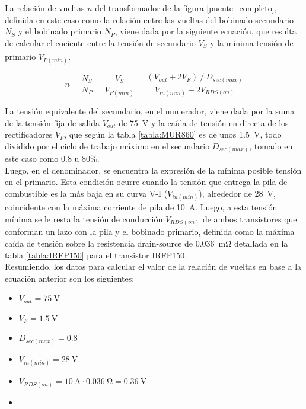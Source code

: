 La relación de vueltas $n$ del transformador de la figura \ref{puente_completo}, definida en este caso como la relación entre las vueltas del bobinado secundario $N_S$ y el bobinado primario $N_P$, viene dada por la siguiente ecuación, que resulta de calcular el cociente entre la tensión de secundario $V_S$ y la mínima tensión de primario $V_{P(min)}$.\textsuperscript{\cite{SoftSwitchPWM}\cite{StudyDesignFullBridge}}

\begin{equation}\label{relacion_vueltas}
    n = \frac{N_S}{N_P} = \frac{V_{S}}{V_{P(min)}} = \frac{(V_{out}+2V_F)\ /\ D_{sec(max)}}{V_{in(min)}-2V_{RDS(on)}}
\end{equation}

La tensión equivalente del secundario, en el numerador, viene dada por la suma de la tensión fija de salida $V_{out}$ de \SI[]{75}{\volt} y la caída de tensión en directa de los rectificadores $V_F$, que según la tabla \ref{tabla:MUR860} es de unos \SI[]{1.5}{\volt}, todo dividido por el ciclo de trabajo máximo en el secundario $D_{sec(max)}$, tomado en este caso como \num{0.8} u \num{80}\%.\\

Luego, en el denominador, se encuentra la expresión de la mínima posible tensión en el primario. Esta condición ocurre cuando la tensión que entrega la pila de combustible es la más baja en su curva V-I ($V_{in(min)}$), alrededor de \SI[]{28}{\volt}, coincidente con la máxima corriente de pila de \SI[]{10}{\ampere}. Luego, a esta tensión mínima se le resta la tensión de conducción $V_{RDS(on)}$ de ambos transistores que conforman un lazo con la pila y el bobinado primario, definida como la máxima caída de tensión sobre la resistencia drain-source de \SI[]{0.036}{\milli\ohm} detallada en la tabla \ref{tabla:IRFP150} para el transistor IRFP150.\\

Resumiendo, los datos para calcular el valor de la relación de vueltas en base a la ecuación anterior son los siguientes:

\begin{multicols}{2}
    \begin{itemize}
        \item $V_{out} = \SI[]{75}{\volt}$
        \item $V_F = \SI[]{1.5}{\volt}$
        \item $D_{sec(max)} = 0.8$
        \item $V_{in(min)} = \SI[]{28}{\volt}$
        \item $V_{RDS(on)} = \SI[]{10}{\ampere}\cdot\SI[]{0.036}{\ohm} = \SI[]{0.36}{\volt}$
        \item[\vspace{\fill}]       %
    \end{itemize}
\end{multicols}

